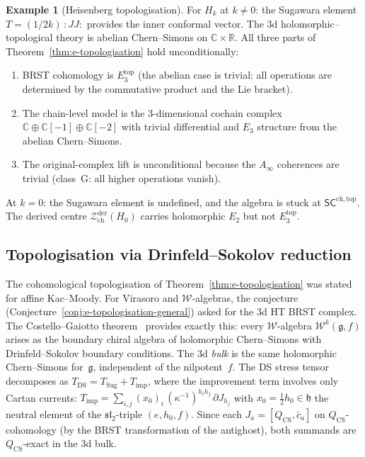\documentclass[11pt,reqno]{amsart}
\theoremstyle{definition}
\newtheorem{example}[theorem]{Example}
\theoremstyle{remark}
\providecommand{\cW}{\mathcal{W}}
\providecommand{\cZ}{\mathcal{Z}}
\providecommand{\fg}{\mathfrak{g}}
\providecommand{\fh}{\mathfrak{h}}
\providecommand{\Ainf}{A_\infty}
\providecommand{\Etwo}{E_2}
\providecommand{\Ethree}{E_3}
\providecommand{\SCchtop}{\ensuremath{\mathsf{SC}^{\mathrm{ch,top}}}}
\providecommand{\bC}{\mathbb{C}}
\providecommand{\bR}{\mathbb{R}}
\begin{document}
\begin{example}[Heisenberg topologisation]
\label{ex:e-heis-topologisation}
For $H_k$ at $k \neq 0$: the Sugawara element
$T = (1/2k)\,{:}JJ{:}$ provides the inner conformal vector.
The $3$d holomorphic--topological theory is abelian Chern--Simons
on $\bC \times \bR$. All three parts of
Theorem~\ref{thm:e-topologisation} hold unconditionally:
\begin{enumerate}[label=\textup{(\roman*)}]
\item BRST cohomology is $\Ethree^{\mathrm{top}}$
 (the abelian case is trivial: all operations are determined
 by the commutative product and the Lie bracket).
\item The chain-level model is the $3$-dimensional cochain
 complex $\bC \oplus \bC[-1] \oplus \bC[-2]$ with trivial
 differential and $\Ethree$ structure from the abelian
 Chern--Simons.
\item The original-complex lift is unconditional because the
 $\Ainf$ coherences are trivial (class~G: all higher operations
 vanish).
\end{enumerate}
At $k = 0$: the Sugawara element is undefined, and the algebra
is stuck at $\SCchtop$. The derived centre
$\cZ^{\mathrm{der}}_{\mathrm{ch}}(H_0)$ carries holomorphic
$\Etwo$ but not $\Ethree^{\mathrm{top}}$.
\end{example}

\subsection{Topologisation via Drinfeld--Sokolov reduction}
\label{subsec:topologisation-DS}

The cohomological topologisation of
Theorem~\ref{thm:e-topologisation} was stated for affine
Kac--Moody. For Virasoro and $\cW$-algebras, the conjecture
(Conjecture~\ref{conj:e-topologisation-general}) asked for the
$3$d HT BRST complex. The Costello--Gaiotto
theorem~\cite{CostelloGaiotto} provides exactly this: every
$\cW$-algebra $\cW^k(\fg, f)$ arises as the boundary chiral
algebra of holomorphic Chern--Simons with Drinfeld--Sokolov
boundary conditions. The $3$d \emph{bulk} is the same
holomorphic Chern--Simons for~$\fg$, independent of the
nilpotent~$f$. The DS stress tensor decomposes as
$T_{\mathrm{DS}} = T_{\mathrm{Sug}} + T_{\mathrm{imp}}$,
where the improvement term involves only Cartan currents:
$T_{\mathrm{imp}} = \sum_{i,j}(x_0)_i\,
(\kappa^{-1})^{h_i h_j}\,\partial J_{h_j}$
with $x_0 = \tfrac{1}{2}h_0 \in \fh$ the neutral element of the
$\mathfrak{sl}_2$-triple $(e, h_0, f)$.
Since each $J_a = [Q_{\mathrm{CS}}, \bar c_a]$ on
$Q_{\mathrm{CS}}$-cohomology (by the BRST transformation of the
antighost), both summands are $Q_{\mathrm{CS}}$-exact in the $3$d
bulk.
\end{document}
